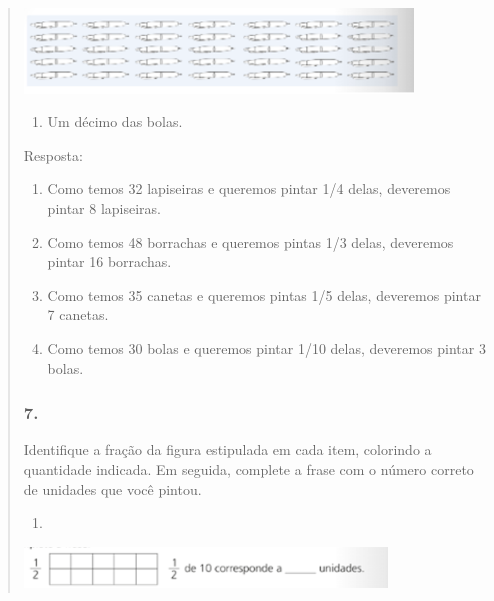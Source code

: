 \begin{mdframed}[linewidth=2pt,linecolor=salmao,roundcorner=2pt]
\begin{itemize}
{\begin{itemize}
\begin{escolha}
{\begin{quote}
{\begin{escolha}
{{{{\includegraphics[width=4.06702in,height=0.89174in]{media/image113.png}


\begin{enumerate}
\item
  Um décimo das bolas.
\end{enumerate}


Resposta:

\begin{enumerate}
\item
  Como temos 32 lapiseiras e queremos pintar 1/4 delas, deveremos pintar 8
  lapiseiras.
\item
  Como temos 48 borrachas e queremos pintas 1/3 delas, deveremos pintar
  16 borrachas.
\item
  Como temos 35 canetas e queremos pintas 1/5 delas, deveremos pintar 7
  canetas.
\item
  Como temos 30 bolas e queremos pintar 1/10 delas, deveremos pintar 3
  bolas.
\end{enumerate}

\subsubsection{7. }

Identifique a fração da figura estipulada em cada item, colorindo a
quantidade indicada. Em seguida, complete a frase com o número correto de
unidades que você pintou.


\begin{enumerate}
\item
\end{enumerate}

\includegraphics[width=3.79199in,height=0.43337in]{media/image114.png}

}}}}
\end{escolha}}
\end{quote}}
\end{escolha}
\end{itemize}}
\end{itemize}
\end{mdframed}
